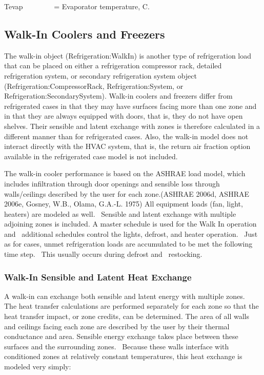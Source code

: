 Tevap~~~~~~~~ = Evaporator temperature, C.

\subsection{Walk-In Coolers and Freezers}\label{walk-in-coolers-and-freezers}

The walk-in object (Refrigeration:WalkIn) is another type of refrigeration load that can be placed on either a refrigeration compressor rack, detailed refrigeration system, or secondary refrigeration system object (Refrigeration:CompressorRack, Refrigeration:System, or Refrigeration:SecondarySystem). Walk-in coolers and freezers differ from refrigerated cases in that they may have surfaces facing more than one zone and in that they are always equipped with doors, that is, they do not have open shelves. Their sensible and latent exchange with zones is therefore calculated in a different manner than for refrigerated cases. Also, the walk-in model does not interact directly with the HVAC system, that is, the return air fraction option available in the refrigerated case model is not included.

The walk-in cooler performance is based on the ASHRAE load model, which includes infiltration through door openings and sensible loss through walls/ceilings described by the user for each zone.(ASHRAE 2006d, ASHRAE 2006e, Gosney, W.B., Olama, G.A.-L. 1975) All equipment loads (fan, light, heaters) are modeled as well.~ Sensible and latent exchange with multiple adjoining zones is included. A master schedule is used for the Walk In operation and~ additional schedules control the lights, defrost, and heater operation. ~Just as for cases, unmet refrigeration loads are accumulated to be met the following time step.~ This usually occurs during defrost and ~restocking.

\subsubsection{Walk-In Sensible and Latent Heat Exchange}\label{walk-in-sensible-and-latent-heat-exchange}

A walk-in can exchange both sensible and latent energy with multiple zones.~ The heat transfer calculations are performed separately for each zone so that the heat transfer impact, or zone credits, can be determined. The area of all walls and ceilings facing each zone are described by the user by their thermal conductance and area. Sensible energy exchange takes place between these surfaces and the surrounding zones.~ Because these walls interface with conditioned zones at relatively constant temperatures, this heat exchange is modeled very simply:

